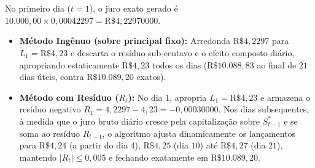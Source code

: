 \documentclass[11pt, a4paper]{article}
\begin{document}
No primeiro dia ($t=1$), o juro exato gerado é $10.000{,}00 \times 0{,}00042297 = \text{R\$ } 4{,}22970000$.
\begin{itemize}
    \item \textbf{Método Ingênuo (sobre principal fixo):} Arredonda $\text{R\$ } 4{,}2297$ para $\tilde{L}_1 = \text{R\$ } 4{,}23$ e descarta o resíduo sub-centavo e o efeito composto diário, apropriando estaticamente $\text{R\$ } 4{,}23$ todos os dias ($\text{R\$ } 10.088{,}83$ ao final de $21$ dias úteis, contra $\text{R\$ } 10.089{,}20$ exatos).
    \item \textbf{Método com Resíduo ($R_t$):} No dia $1$, apropria $L_1 = \text{R\$ } 4{,}23$ e armazena o resíduo negativo $R_1 = 4{,}2297 - 4{,}23 = -0{,}00030000$. Nos dias subsequentes, à medida que o juro bruto diário cresce pela capitalização sobre $S_{t-1}^{*}$ e se soma ao resíduo $R_{t-1}$, o algoritmo ajusta dinamicamente os lançamentos para $\text{R\$ } 4{,}24$ (a partir do dia $4$), $\text{R\$ } 4{,}25$ (dia $10$) até $\text{R\$ } 4{,}27$ (dia $21$), mantendo $|R_t| \le 0{,}005$ e fechando exatamente em $\text{R\$ } 10.089{,}20$.
\end{itemize}
\end{document}
